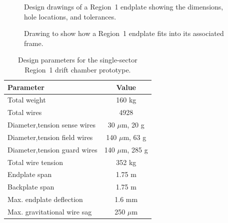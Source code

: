 \begin{figure}[htbp]
\vspace{21.0cm}
\caption{\small{Design drawings of a Region~1 endplate showing the dimensions,
hole locations, and tolerances.}}
\label{endplate}
\end{figure}

\begin{figure}[htbp]
\vspace{9.0cm}
\caption{\small{Drawing to show how a Region~1 endplate fits into its 
associated frame.}}
\label{frame}
\end{figure}

\begin{table}[htbp]
\begin{center}
\begin{tabular} {||l|c||} \hline \hline
{\bf Parameter}              &  {\bf Value}      \\ \hline
Total weight                 & 160 kg            \\ \hline
Total wires                  & 4928              \\ \hline
Diameter,tension sense wires & 30 $\mu$m, 20 g   \\ \hline
Diameter,tension field wires & 140 $\mu$m, 63 g  \\ \hline
Diameter,tension guard wires & 140 $\mu$m, 285 g \\ \hline
Total wire tension           & 352 kg            \\ \hline
Endplate span                & 1.75 m            \\ \hline
Backplate span               & 1.75 m            \\ \hline
Max. endplate deflection     & 1.6 mm            \\ \hline
Max. gravitational wire sag  & 250 $\mu$m        \\ \hline \hline
\end{tabular}
\caption{\small{Design parameters for the single-sector Region~1 drift 
chamber prototype.}}
\label{reg1-design-parms}
\end{center}
\end{table}


